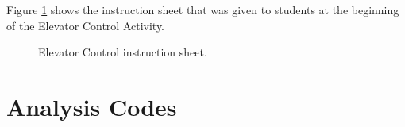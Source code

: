 
	\label{sec:elevator_handout}
	Figure \ref{fig:elevator-instructions} shows the instruction sheet that was given to students at the beginning of the Elevator Control Activity.
	
	\begin{figure}%
   	\centering
   	\caption{Elevator Control instruction sheet.}
   	\label{fig:elevator-instructions}
	\end{figure}

\chapter{Analysis Codes}

